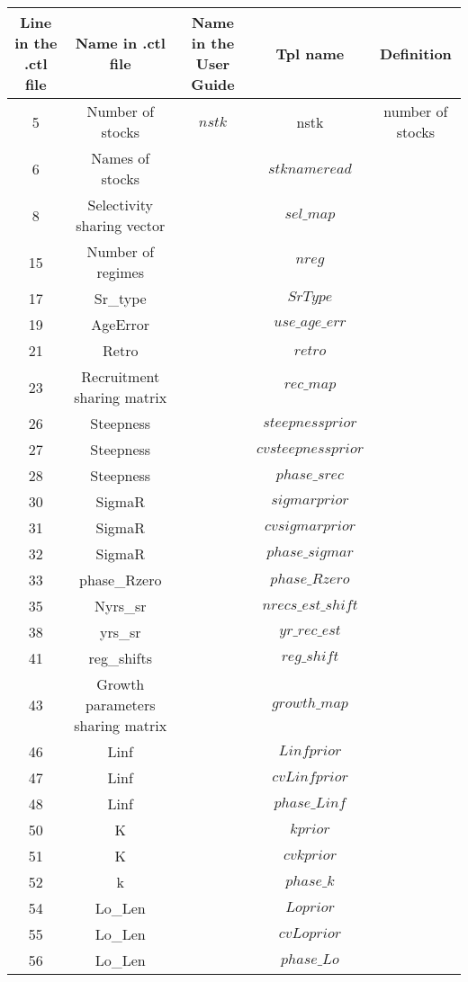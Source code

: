 \documentclass{article}
\begin{document}
\begin{tabular}{| c | c | c | c | c |}
\hline
Line in the .ctl file & Name in .ctl file  & Name in the User Guide & Tpl name & Definition\\ \hline
 5 &  Number of stocks & $nstk$  & nstk & number of stocks\\ \hline
6 &  Names of stocks &  & $stknameread$   & \\ \hline
8 &  Selectivity sharing vector &   & $sel\_map$ &\\ \hline
15 &  Number of regimes &   & $nreg$ &\\ \hline
17 &  Sr\_type &   & $SrType$ &\\ \hline
19 &  AgeError &   & $use\_age\_err$ &\\ \hline
21 &  Retro &   & $retro$ &\\ \hline
23 & Recruitment sharing matrix &   & $rec\_map$ &\\ \hline
26 &  Steepness &   & $steepnessprior$ &\\ \hline
27 &  Steepness &   & $cvsteepnessprior$ &\\ \hline
28 &  Steepness &   & $phase\_srec$ &\\ \hline
30 &  SigmaR &   & $sigmarprior$ &\\ \hline
31 &  SigmaR &   & $cvsigmarprior$ &\\ \hline
32 &  SigmaR &   & $phase\_sigmar$ &\\ \hline
33 &  phase\_Rzero &   & $phase\_Rzero$ &\\ \hline
35 &  Nyrs\_sr &   & $nrecs\_est\_shift$ &\\ \hline
38 &  yrs\_sr &   & $yr\_rec\_est$ &\\ \hline
41 &  reg\_shifts &   & $reg\_shift$ &\\ \hline
43 &  Growth parameters sharing matrix &   & $growth\_map$ &\\ \hline
46 &  Linf &   & $Linfprior$ &\\ \hline
47 &  Linf &   & $cvLinfprior$ &\\ \hline
48 &  Linf &   & $phase\_Linf$ &\\ \hline
50 &  K &   & $kprior$ &\\ \hline
51 & K &   & $cvkprior$ &\\ \hline
52 &  k &   & $phase\_k$ &\\ \hline
54 &  Lo\_Len &   & $Loprior$ &\\ \hline
55 &  Lo\_Len  &   & $cvLoprior$ &\\ \hline
56 &  Lo\_Len  &   & $phase\_Lo$ &\\ \hline

\end{tabular}
\end{document}
